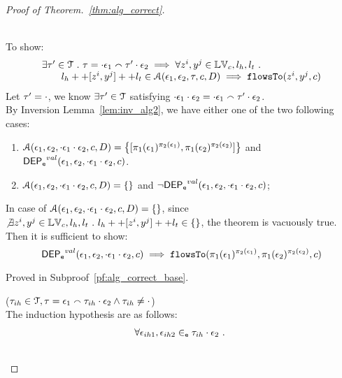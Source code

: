 \begin{proof}[Proof of Theorem.~\ref{thm:alg_correct}]
\begin{case}
\\
To show:
\[
\begin{array}{l}
  \exists \mathtt{\tau}' \in \mathcal{T} ~.~ \mathtt{\tau} = \cdot \mathtt{\epsilon}_1 \smallfrown \mathtt{\tau}' \cdot \mathtt{\epsilon}_2
  \implies    
  \forall  z^i, y^j \in \mathbb{LV}_c, l_h, l_t ~.~ 
    \\ \qquad 
    l_h ++ [z^i, y^j] ++ l_t \in \mathcal{A}(\mathtt{\epsilon}_1, \mathtt{\epsilon}_2, \mathtt{\tau}, c, D)
   \implies \mathtt{flowsTo}(z^i, y^j, c)
\end{array}
\]
%
Let $\mathtt{\tau}' = \cdot$, we know $\exists \mathtt{\tau}' \in \mathcal{T}$ satisfying 
$\cdot {} \mathtt{\epsilon}_1  {} \cdot {} \mathtt{\epsilon}_2 = \cdot {} \mathtt{\epsilon}_1 \smallfrown \mathtt{\tau}' \cdot \mathtt{\epsilon}_2$.
\\
By Inversion Lemma~\ref{lem:inv_alg2}, we have either one of the two following cases:
\begin{enumerate}
  \item $\mathcal{A}(\event_1, \event_2, \cdot \event_1 \cdot \event_2, c, D) = 
  \left\{[\pi_1(\event_1)^{\pi_2(\event_1)}, \pi_1(\event_2)^{\pi_2(\event_2)}] \right \}$ 
  and $\mathsf{DEP_{\mathtt{e}}}^{val}(\mathtt{\epsilon}_1, \mathtt{\epsilon}_2, \cdot  \mathtt{\epsilon}_1 \cdot \mathtt{\epsilon}_2, c)$.
  \item  $\mathcal{A}(\mathtt{\epsilon}_1, \mathtt{\epsilon}_2, \cdot \mathtt{\epsilon}_1 \cdot \mathtt{\epsilon}_2, c, D) = \{\}$ 
  and $\neg \mathsf{DEP_{\mathtt{e}}}^{val}(\mathtt{\epsilon}_1, \mathtt{\epsilon}_2, \cdot  \mathtt{\epsilon}_1 \cdot \mathtt{\epsilon}_2, c)$;
\end{enumerate}
%
In case of $\mathcal{A}(\mathtt{\epsilon}_1, \mathtt{\epsilon}_2, \cdot \mathtt{\epsilon}_1 \cdot \mathtt{\epsilon}_2, c, D) = \{\}$,
since $\not\exists  z^i, y^j \in \mathbb{LV}_c, l_h, l_t ~.~ l_h ++ [z^i, y^j] ++ l_t \in \{\}$, the theorem is vacuously true.
%
\\
Then it is sufficient to show: 
\[
  \mathsf{DEP_{\mathtt{e}}}^{val}(\mathtt{\epsilon}_1, \mathtt{\epsilon}_2, \cdot \mathtt{\epsilon}_1 \cdot \mathtt{\epsilon}_2, c) \implies \mathtt{flowsTo}(\pi_1(\mathtt{\epsilon}_1)^{\pi_2(\mathtt{\epsilon}_1)}, \pi_1(\mathtt{\epsilon}_2)^{\pi_2(\mathtt{\epsilon}_2)}, c)
\]
%

Proved in Subproof~\ref{pf:alg_correct_base}.
%
\end{case}
%
\begin{case}
($\mathtt{\tau}_{ih} \in \mathcal{T}, \mathtt{\tau} = \mathtt{\epsilon}_1 \smallfrown \mathtt{\tau}_{ih} \cdot \mathtt{\epsilon}_2 \land \mathtt{\tau}_{ih} \neq \cdot$)
\\
The induction hypothesis are as follows:
%
\[
\begin{array}{l}
  \forall \mathtt{\epsilon}_{ih1}, \mathtt{\epsilon}_{ih2} \in_{\mathtt{e}} \mathtt{\tau}_{ih} \cdot \mathtt{\epsilon}_2 ~.~
   \\ \quad

\end{array}\]
\end{case}
\end{proof}
